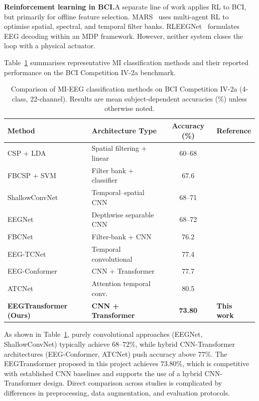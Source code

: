 \documentclass[12pt, a4paper]{article}
\begin{document}
\textbf{Reinforcement learning in BCI.}\quad A separate line of work applies RL to BCI, but primarily for offline feature selection. MARS~\cite{shin2024mars} uses multi-agent RL to optimise spatial, spectral, and temporal filter banks. RLEEGNet~\cite{nallani2024rleegnet} formulates EEG decoding within an MDP framework. However, neither system closes the loop with a physical actuator.

Table~\ref{tab:lit_methods} summarises representative MI classification methods and their reported performance on the BCI Competition IV-2a benchmark.

\begin{table}[htbp]
\centering
\caption{Comparison of MI-EEG classification methods on BCI Competition IV-2a (4-class, 22-channel). Results are mean subject-dependent accuracies (\%) unless otherwise noted.}
\label{tab:lit_methods}
\begin{tabular}{@{} l l c l @{}}
\toprule
\textbf{Method} & \textbf{Architecture Type} & \textbf{Accuracy (\%)} & \textbf{Reference} \\
\midrule
CSP + LDA           & Spatial filtering + linear      & 60--68   & \cite{hameed2025enhancing} \\
FBCSP + SVM         & Filter bank + classifier        & 67.6     & \cite{ang2008fbcsp} \\
ShallowConvNet      & Temporal--spatial CNN            & 68--71   & \cite{schirrmeister2017deep} \\
EEGNet              & Depthwise separable CNN          & 68--72   & \cite{lawhern2018eegnet} \\
FBCNet              & Filter-bank + CNN               & 76.2     & \cite{mane2021fbcnet} \\
EEG-TCNet           & Temporal convolutional           & 77.4     & \cite{ingolfsson2020eeg} \\
EEG-Conformer       & CNN + Transformer                & 77.7     & \cite{song2022eeg} \\
ATCNet              & Attention temporal conv.         & 80.5     & \cite{altaheri2022atcnet} \\
\midrule
\textbf{EEGTransformer (Ours)} & \textbf{CNN + Transformer} & \textbf{73.80} & \textbf{This work} \\
\bottomrule
\end{tabular}
\end{table}

As shown in Table~\ref{tab:lit_methods}, purely convolutional approaches (EEGNet, ShallowConvNet) typically achieve 68--72\%, while hybrid CNN-Transformer architectures (EEG-Conformer, ATCNet) push accuracy above 77\%. The EEGTransformer proposed in this project achieves 73.80\%, which is competitive with established CNN baselines and supports the use of a hybrid CNN-Transformer design. Direct comparison across studies is complicated by differences in preprocessing, data augmentation, and evaluation protocols.
\end{document}
